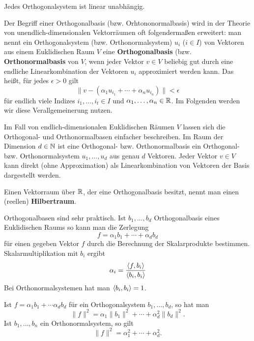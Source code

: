 \begin{bem}
	Jedes Orthogonalsystem ist linear unabhängig. 
\end{bem} 

\begin{defn}
	Der Begriff einer Orthogonalbasis (bzw. Orhtononormalbasis) wird in der Theorie von unendlich-dimensionalen Vektorräumen oft folgendermaßen erweitert: man nennt ein Orthogonalsystem (bzw. Orthonormalsystem) $u_i$ ($i \in I$) von Vektoren aus einem Euklidischen Raum $V$ eine \textbf{Orthogonalbasis} (bzw. \textbf{Orthonormalbasis} von $V$, wenn jeder Vektor $v \in V$ beliebig gut durch eine endliche Linearkombination der Vektoren $u_i$ approximiert werden kann. Das heißt, für jedes $\epsilon>0$ gilt 
	\[
			\| v - (\alpha_1 u_{i_1}+ \cdots + \alpha_n u_{i_n})\| < \epsilon
	\] für endlich viele Indizes $i_1,\ldots,i_t \in I$ und $\alpha_1,\ldots,\alpha_n \in \mathbb{R}$. Im Folgenden werden wir diese Verallgemeinerung nutzen. 
\end{defn} 

\begin{bem}
	Im Fall von endlich-dimensionalen Euklidischen Räumen $V$ lassen sich die Orthogonal- und Orthonormalbasen einfacher beschreiben. Im Raum der Dimension $d \in \mathbb{N}$ ist eine Orthogonal- bzw. Orthonormalbasis ein Orthogonal- bzw. Orthonormalsystem $u_1,\ldots,u_d$ aus genau $d$ Vektoren. Jeder Vektor $v \in V$ kann direkt (ohne Approximation) als Linearkombination von Vektoren der Basis dargestellt werden. 
\end{bem} 

\begin{defn}
	Einen Vektorraum über $\mathbb{R}$, der eine Orthogonalbasis besitzt, nennt man einen (reellen) \textbf{Hilbertraum}.
\end{defn} 


\begin{bem}[Orthogonalbasen]
	Orthogonalbasen sind sehr praktisch. Ist $b_1,\ldots,b_d$ Orthogonalbasis eines Euklidischen Raums so kann man die Zerlegung
	\[
	f = \alpha_1 b_1 + \cdots + \alpha_d b_d
	\]
	für einen gegeben Vektor $f$ durch die Berechnung der Skalarprodukte bestimmen. Skalarmultiplikation mit $b_i$ ergibt 
	\[
	\alpha_i = \frac{ \left< f , b_i \right> }{\left< b_i , b_i \right>}
	\]
	Bei Orthonormalsystemen hat man $\left< b_i , b_i \right> =1$. 
\end{bem} 

\begin{bem} Ist $f = \alpha_1 b_ 1+ \cdots \alpha_d b_d$ für ein Orthogonalsystem $b_1,\ldots,b_d$, so hat man 
	\[
		\|f\|^2 = \alpha_1 \|b_1\|^2 + \cdots + \alpha_d^2 \|b_d \|^2.
	\]
	Ist $b_1,\ldots,b_n$ ein Orthonormalsystem, so gilt 
	\[
		\|f\|^2 = \alpha_1^2 + \cdots + \alpha_d^2. 
	\]
\end{bem} 


